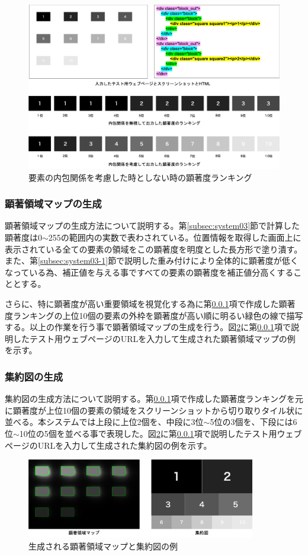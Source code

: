 \begin{figure}[H]
    \centering
    \includegraphics[width=12cm]{figures/include-rank.png}
    \caption{要素の内包関係を考慮した時としない時の顕著度ランキング}
    \label{fig_system4-rank}
\end{figure}

\subsubsection{顕著領域マップの生成}\label{subsec:system04-1}
\par 顕著領域マップの生成方法について説明する。第\ref{subsec:system03}節で計算した顕著度は0$\sim$255の範囲内の実数で表わされている。位置情報を取得した画面上に表示されている全ての要素の領域をこの顕著度を明度とした長方形で塗り潰す。また、第\ref{subsec:system03-1}節で説明した重み付けにより全体的に顕著度が低くなっている為、補正値を与える事ですべての要素の顕著度を補正値分高くすることとする。
\par さらに、特に顕著度が高い重要領域を視覚化する為に第\ref{subsec:system04-1}項で作成した顕著度ランキングの上位10個の要素の外枠を顕著度が高い順に明るい緑色の線で描写する。以上の作業を行う事で顕著領域マップの生成を行う。図\ref{fig_tile-example}に第\ref{subsec:system04-1}項で説明したテスト用ウェブページのURLを入力して生成された顕著領域マップの例を示す。

\subsubsection{集約図の生成}\label{subsec:system04-2}
\par 集約図の生成方法について説明する。第\ref{subsec:system04-1}項で作成した顕著度ランキングを元に顕著度が上位10個の要素の領域をスクリーンショットから切り取りタイル状に並べる。本システムでは上段に上位2個を、中段に3位$\sim$5位の3個を、下段には6位$\sim$10位の5個を並べる事で表現した。図\ref{fig_tile-example}に第\ref{subsec:system04-1}項で説明したテスト用ウェブページのURLを入力して生成された集約図の例を示す。


\begin{figure}[H]
    \centering
    \includegraphics[width=10cm]{figures/example-output.png}
    \caption{生成される顕著領域マップと集約図の例}
    \label{fig_tile-example}
\end{figure}
